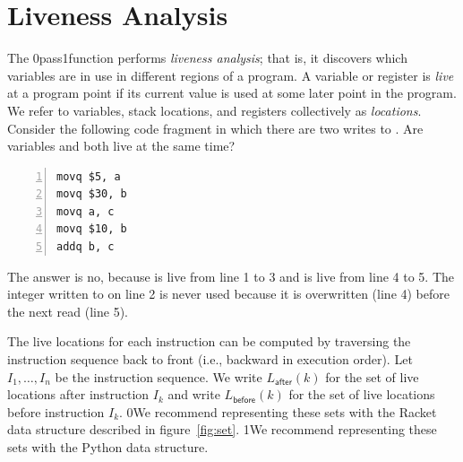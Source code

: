 \documentclass[7x10]{TimesAPriori_MIT}%
\def\racketEd{0}
\def\pythonEd{1}
\def\edition{1}
\newcommand{\racket}[1]{{\if\edition\racketEd{#1}\fi}}
\newcommand{\pythonColor}[0]{}
\newcommand{\python}[1]{{\if\edition\pythonEd\pythonColor #1\fi}}
\numberwithin{theorem}{chapter}
\numberwithin{definition}{chapter}
\numberwithin{equation}{chapter}
\begin{document}

\section{Liveness Analysis}
\label{sec:liveness-analysis-Lvar}

The  \racket{pass}\python{function} performs
\emph{liveness analysis}; that is, it discovers which variables are
in use in different regions of a program.
%
A variable or register is \emph{live} at a program point if its
current value is used at some later point in the program.  We refer to
variables, stack locations, and registers collectively as
\emph{locations}.
%
Consider the following code fragment in which there are two writes to
. Are variables  and  both live at the same
time?
\begin{center}
  \begin{minipage}{0.85\textwidth}
\begin{lstlisting}[numbers=left,numberstyle=\tiny]
movq $5, a
movq $30, b
movq a, c
movq $10, b
addq b, c
\end{lstlisting}
\end{minipage}
\end{center}
The answer is no, because  is live from line 1 to 3 and
 is live from line 4 to 5.  The integer written to  on
line 2 is never used because it is overwritten (line 4) before the
next read (line 5).

The live locations for each instruction can be computed by traversing
the instruction sequence back to front (i.e., backward in execution
order).  Let $I_1,\ldots, I_n$ be the instruction sequence. We write
$L_{\mathsf{after}}(k)$ for the set of live locations after
instruction $I_k$ and write $L_{\mathsf{before}}(k)$ for the set of live
locations before instruction $I_k$.  \racket{We recommend representing
  these sets with the Racket  data structure described in
  figure~\ref{fig:set}.}  \python{We recommend representing these sets
  with the Python
  \href{https://docs.python.org/3.10/library/stdtypes.html\#set-types-set-frozenset}{\code{set}}
  data structure.}
\end{document}
